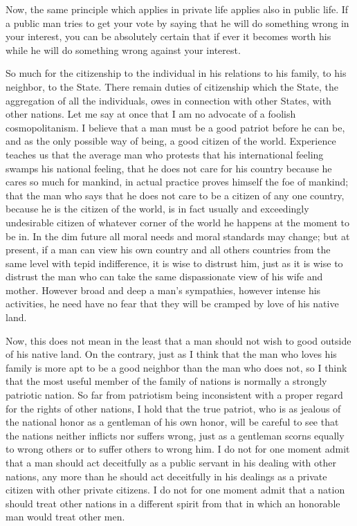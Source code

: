 \documentclass[a4paper]{amsbook}
\begin{document}
Now, the same principle which applies in private life applies also in public life. If a public man tries to get your vote by saying that he will do something wrong in your interest, you can be absolutely certain that if ever it becomes worth his while he will do something wrong against your interest.

So much for the citizenship to the individual in his relations to his family, to his neighbor, to the State. There remain duties of citizenship which the State, the aggregation of all the individuals, owes in connection with other States, with other nations. Let me say at once that I am no advocate of a foolish cosmopolitanism. I believe that a man must be a good patriot before he can be, and as the only possible way of being, a good citizen of the world. Experience teaches us that the average man who protests that his international feeling swamps his national feeling, that he does not care for his country because he cares so much for mankind, in actual practice proves himself the foe of mankind; that the man who says that he does not care to be a citizen of any one country, because he is the citizen of the world, is in fact usually and exceedingly undesirable citizen of whatever corner of the world he happens at the moment to be in. In the dim future all moral needs and moral standards may change; but at present, if a man can view his own country and all others countries from the same level with tepid indifference, it is wise to distrust him, just as it is wise to distrust the man who can take the same dispassionate view of his wife and mother. However broad and deep a man's sympathies, however intense his activities, he need have no fear that they will be cramped by love of his native land.

Now, this does not mean in the least that a man should not wish to good outside of his native land. On the contrary, just as I think that the man who loves his family is more apt to be a good neighbor than the man who does not, so I think that the most useful member of the family of nations is normally a strongly patriotic nation. So far from patriotism being inconsistent with a proper regard for the rights of other nations, I hold that the true patriot, who is as jealous of the national honor as a gentleman of his own honor, will be careful to see that the nations neither inflicts nor suffers wrong, just as a gentleman scorns equally to wrong others or to suffer others to wrong him. I do not for one moment admit that a man should act deceitfully as a public servant in his dealing with other nations, any more than he should act deceitfully in his dealings as a private citizen with other private citizens. I do not for one moment admit that a nation should treat other nations in a different spirit from that in which an honorable man would treat other men.
\end{document}
